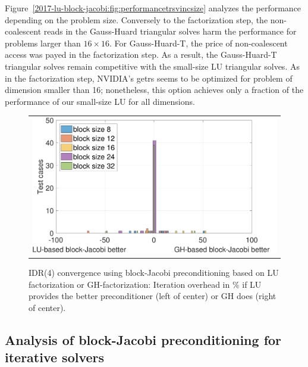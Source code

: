 Figure~\ref{2017-lu-block-jacobi:fig:performancetrsvincsize} analyzes the performance depending on the problem size.
Conversely to the factorization step, the non-coalescent reads in the Gauss-Huard triangular solves 
harm the performance for problems larger than $16\times16$.
For Gauss-Huard-T, the price of non-coalescent access was payed in the factorization step.
As a result, the Gauss-Huard-T triangular solves remain competitive with the
small-size LU triangular solves.
As in the factorization step, NVIDIA's {\sc getrs} seems to be optimized for problem of dimension smaller than 16;
nonetheless, this option achieves only a fraction of the performance of our small-size LU for all dimensions.



\begin{figure}
\begin{center}
\begin{tabular}{c}
\includegraphics[width=.45\columnwidth]{plots/iteration_distribution_LU_GH_new}\\
\end{tabular}
\end{center}
\caption{
IDR(4) convergence using block-Jacobi preconditioning based on LU factorization or GH-factorization: 
Iteration overhead in \% if LU provides the better preconditioner (left of center) or GH does (right of center).
}
\label{2017-lu-block-jacobi:fig:iterdist}
\end{figure}


\subsection{Analysis of block-Jacobi preconditioning for iterative solvers}

